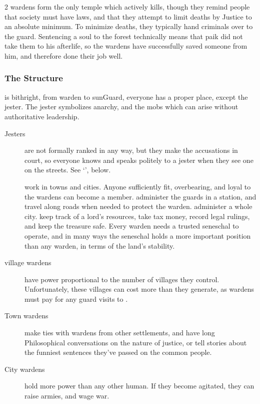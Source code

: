 \begin{multicols}{2}
\Glspl{warden} form the only \gls{temple} which actively kills, though they remind people that society must have laws, and that they attempt to limit deaths by Justice to an absolute minimum.
To minimize deaths, they typically hand criminals over to the \gls{guard}.
Sentencing a soul to the forest technically means that \gls{paik} did not take them to his afterlife, so the \glspl{warden} have successfully saved someone from him, and therefore done their job well.


\subsubsection{The Structure}
is bithright, from \gls{warden} to \gls{sunGuard}, everyone has a proper place, except the jester.
The jester symbolizes anarchy, and the mobs which can arise without authoritative leadership.

\begin{description}
  \item[Jesters]
  are not formally ranked in any way, but they make the accusations in court, so everyone knows and speaks politely to a jester when they see one on the streets.
  See `', below.
  \item[]
  work in towns and cities.
  Anyone sufficiently fit, overbearing, and loyal to the \glspl{warden} can become a member.
  administer the guards in a station, and travel along roads when needed to protect the \gls{warden}.
  administer a whole city.
  keep track of a lord's resources, take tax money, record legal rulings, and keep the treasure safe.
  Every \gls{warden} needs a trusted seneschal to operate, and in many ways the seneschal holds a more important position than any \gls{warden}, in terms of the land's stability.
  \item[\Gls{village} \Glspl{warden}]
  have power proportional to the number of \glspl{village} they control.
  Unfortunately, these \glspl{village} can cost more than they generate, as \glspl{warden} must pay for any \gls{guard} visits to .
  \item[Town \Glspl{warden}]
  make ties with \glspl{warden} from other settlements, and have long Philosophical conversations on the nature of justice, or tell stories about the funniest sentences they've passed on the common people.
  \item[City \Glspl{warden}]
  hold more power than any other human.
  If they become agitated, they can raise armies, and wage war.
\end{description}


\end{multicols}
